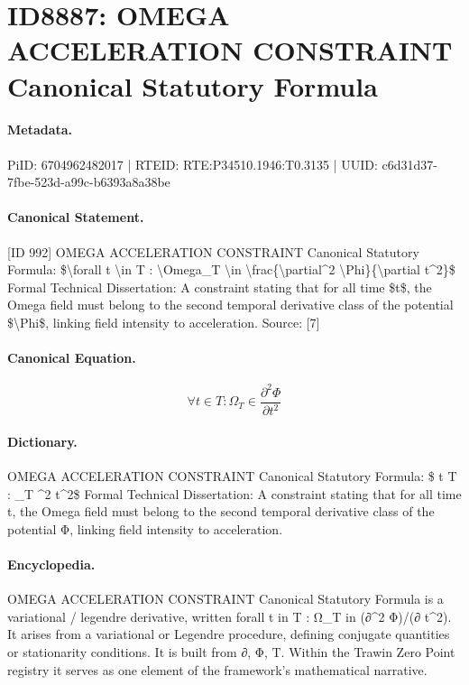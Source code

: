 \section*{ID8887: OMEGA ACCELERATION CONSTRAINT Canonical Statutory Formula}
\paragraph{Metadata.}
PiID: 6704962482017 | RTEID: RTE:P34510.1946:T0.3135 | UUID: c6d31d37-7fbe-523d-a99c-b6393a8a38be

\paragraph{Canonical Statement.}
[ID 992] OMEGA ACCELERATION CONSTRAINT Canonical Statutory Formula: \$\textbackslash{}forall t \textbackslash{}in T : \textbackslash{}Omega\_T \textbackslash{}in \textbackslash{}frac\{\textbackslash{}partial\textasciicircum{}2 \textbackslash{}Phi\}\{\textbackslash{}partial t\textasciicircum{}2\}\$ Formal Technical Dissertation: A constraint stating that for all time \$t\$, the Omega field must belong to the second temporal derivative class of the potential \$\textbackslash{}Phi\$, linking field intensity to acceleration. Source: [7]

\paragraph{Canonical Equation.}
\[
\forall t \in T : \Omega_T \in \frac{\partial^2 \Phi}{\partial t^2}
\]

\paragraph{Dictionary.}
OMEGA ACCELERATION CONSTRAINT Canonical Statutory Formula: \$ t T : \_T \textasciicircum{}2 t\textasciicircum{}2\$ Formal Technical Dissertation: A constraint stating that for all time t, the Omega field must belong to the second temporal derivative class of the potential Φ, linking field intensity to acceleration.

\paragraph{Encyclopedia.}
OMEGA ACCELERATION CONSTRAINT Canonical Statutory Formula is a variational / legendre derivative, written forall t in T : Ω\_T in (∂\textasciicircum{}2 Φ)/(∂ t\textasciicircum{}2). It arises from a variational or Legendre procedure, defining conjugate quantities or stationarity conditions. It is built from ∂, Φ, T. Within the Trawin Zero Point registry it serves as one element of the framework's mathematical narrative.
